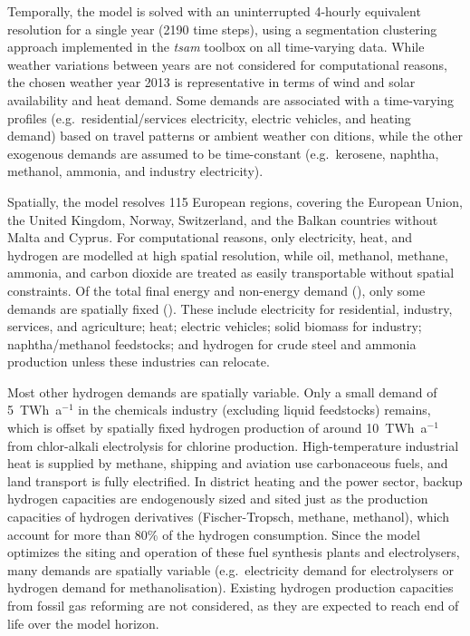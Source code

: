 Temporally, the model is solved with an uninterrupted 4-hourly equivalent
resolution for a single year (2190 time steps), using a segmentation clustering
approach implemented in the \textit{tsam} toolbox on all time-varying
data.\cite{hoffmannParetooptimalTemporal2022} While weather variations between
years are not considered for computational reasons, the chosen weather year 2013
is representative in terms of wind and solar availability and heat
demand.\cite{gotskeDesigningSectorcoupledEuropean2024} Some demands are
associated with a time-varying profiles (e.g.~residential/services electricity,
electric vehicles, and heating demand) based on travel patterns or ambient
weather con ditions, while the other exogenous demands are assumed to be
time-constant (e.g.~kerosene, naphtha, methanol, ammonia, and industry
electricity).

Spatially, the model resolves 115 European
regions,\cite{frysztackiStrongEffect2021} covering the European Union, the
United Kingdom, Norway, Switzerland, and the Balkan countries without Malta and
Cyprus. For computational reasons, only electricity, heat, and hydrogen are
modelled at high spatial resolution, while oil, methanol, methane, ammonia, and
carbon dioxide are treated as easily transportable without spatial constraints.
Of the total final energy and non-energy demand
(), only some demands are spatially fixed
(). These include electricity for residential, industry,
services, and agriculture; heat; electric vehicles; solid biomass for industry;
naphtha/methanol feedstocks; and hydrogen for crude steel and ammonia
production unless these industries can relocate.

Most other hydrogen demands are spatially variable. Only a small demand of
5~TWh~a$^{-1}$ in the chemicals industry (excluding liquid feedstocks) remains,
which is offset by spatially fixed hydrogen production of around 10~TWh~a$^{-1}$
from chlor-alkali electrolysis for chlorine production. High-temperature
industrial heat is supplied by methane, shipping and aviation use carbonaceous
fuels, and land transport is fully electrified. In district heating and the
power sector, backup hydrogen capacities are endogenously sized and sited just
as the production capacities of hydrogen derivatives (Fischer-Tropsch, methane,
methanol), which account for more than 80\% of the hydrogen consumption. Since
the model optimizes the siting and operation of these fuel synthesis plants and
electrolysers, many demands are spatially variable (e.g.~electricity demand for
electrolysers or hydrogen demand for methanolisation). Existing hydrogen
production capacities from fossil gas reforming are not
considered, as they are expected to reach end of life over the model horizon.

